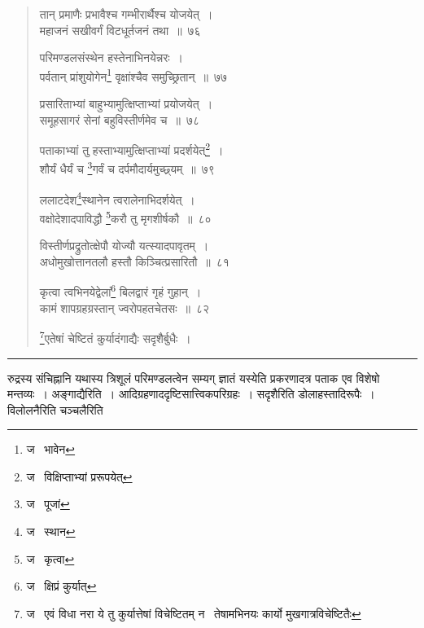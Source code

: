 \documentclass[11pt, openany]{book}
\begin{document}
\newpage

\begin{quote}
{\na तान् प्रमाणैः प्रभावैश्च गम्भीरार्थैश्च योजयेत्~।\\
महाजनं सखीवर्गं विटधूर्तजनं तथा~॥~७६

परिमण्डलसंस्थेन हस्तेनाभिनयेन्नरः~।\\
पर्वतान् प्रांशुयोगेन\renewcommand{\thefootnote}{1}\footnote{ज \textendash\  भावेन} वृक्षांश्चैव समुच्छ्रितान्~॥~७७

प्रसारिताभ्यां बाहुभ्यामुत्क्षिप्ताभ्यां प्रयोजयेत्~।\\
समूहसागरं सेनां बहुविस्तीर्णमेव च~॥~७८

पताकाभ्यां तु हस्ताभ्यामुत्क्षिप्ताभ्यां प्रदर्शयेत्\renewcommand{\thefootnote}{2}\footnote{ज \textendash\  विक्षिप्ताभ्यां प्ररूपयेत्}~।\\
शौर्यं धैर्यं च \renewcommand{\thefootnote}{3}\footnote{ज \textendash\  पूजां}गर्वं च दर्पमौदार्यमुच्छ्र्यम्~॥~७९

ललाटदेश\renewcommand{\thefootnote}{4}\footnote{ज \textendash\  स्थान}स्थानेन त्वरालेनाभिदर्शयेत्~।\\
वक्षोदेशादपाविद्धौ \renewcommand{\thefootnote}{5}\footnote{ज \textendash\  कृत्वा}करौ तु मृगशीर्षकौ~॥~८०

विस्तीर्णप्रद्रुतोत्क्षेपौ योज्यौ यत्स्यादपावृतम्~।\\
अधोमुखोत्तानतलौ हस्तौ किञ्चित्प्रसारितौ~॥~८१

कृत्वा त्वभिनयेद्वेलां\renewcommand{\thefootnote}{6}\footnote{ज \textendash\  क्षिप्रं कुर्यात्} बिलद्वारं गृहं गुहान्~।\\
कामं शापग्रहग्रस्तान् ज्वरोपहतचेतसः~॥~८२

\renewcommand{\thefootnote}{7}\footnote{ज \textendash\  एवं विधा नरा ये तु कुर्यात्तेषां विचेष्टितम् न \textendash\  तेषामभिनयः कार्यो मुखगात्रविचेष्टितैः}एतेषां चेष्टितं कुर्यादंगाद्यैः सदृशैर्बुधैः~।}
\end{quote}

\hrule

\vspace{2mm}
\noindent
रुद्रस्य संचिह्नानि यथास्य त्रिशूलं परिमण्डलत्वेन सम्यग् ज्ञातं यस्येति प्रकरणादत्र पताक एव विशेषो मन्तव्यः~। अङ्गाद्यैरिति~। आदिग्रहणाददृष्टिसात्त्विकपरिग्रहः~। सदृशैरिति डोलाहस्तादिरूपैः~। विलोलनैरिति चञ्चलैरिति

\newpage
\end{document}
